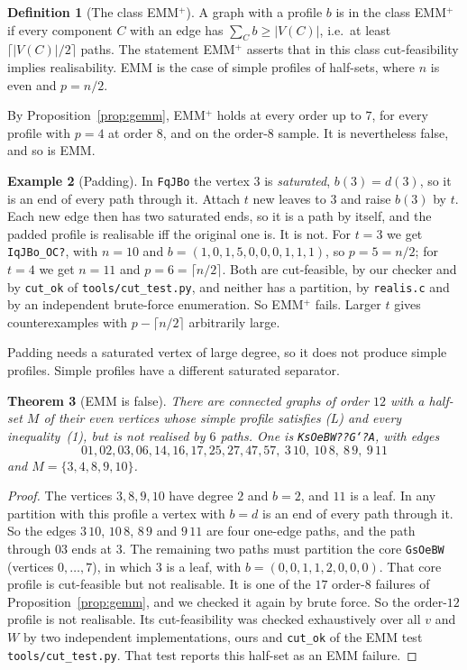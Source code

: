 \documentclass[11pt]{amsart}
\newtheorem{theorem}{Theorem}[section]
\theoremstyle{definition}
\newtheorem{definition}[theorem]{Definition}
\newtheorem{example}[theorem]{Example}
\begin{document}
\begin{definition}[The class EMM$^+$]\label{conj:emmplus}
A graph with a profile $b$ is in the class EMM$^+$ if every component $C$ with an edge has
$\sum_Cb\ge|V(C)|$, i.e.\ at least $\lceil|V(C)|/2\rceil$ paths. The statement EMM$^+$ asserts that
in this class cut-feasibility implies realisability. EMM is the case of simple profiles of
half-sets, where $n$ is even and $p=n/2$.
\end{definition}

By Proposition~\ref{prop:gemm}, EMM$^+$ holds at every order up to $7$, for every profile with $p=4$ at
order $8$, and on the order-$8$ sample. It is nevertheless false, and so is EMM.

\begin{example}[Padding]\label{ex:padding}
In \texttt{FqJBo} the vertex $3$ is \emph{saturated}, $b(3)=d(3)$, so it is an end of every path through
it. Attach $t$ new leaves to $3$ and raise $b(3)$ by $t$. Each new edge then has two saturated ends,
so it is a path by itself, and the padded profile is realisable iff the original one is. It is not.
For $t=3$ we get \texttt{IqJBo\_OC?}, with $n=10$ and $b=(1,0,1,5,0,0,0,1,1,1)$, so $p=5=n/2$; for
$t=4$ we get $n=11$ and $p=6=\lceil n/2\rceil$. Both are cut-feasible, by our checker and by
\texttt{cut\_ok} of \texttt{tools/cut\_test.py}, and neither has a partition, by \texttt{realis.c} and
by an independent brute-force enumeration. So EMM$^+$ fails. Larger $t$ gives counterexamples with
$p-\lceil n/2\rceil$ arbitrarily large.
\end{example}

Padding needs a saturated vertex of large degree, so it does not produce simple profiles. Simple
profiles have a different saturated separator.

\begin{theorem}[EMM is false]\label{thm:emmfalse}
There are connected graphs of order $12$ with a half-set $M$ of their even vertices whose simple
profile satisfies (L) and every inequality~(1), but is not realised by $6$ paths. One is
\texttt{KsOeBW??G`?A}, with edges
\[
01,02,03,06,14,16,17,25,27,47,57,\ 3\,10,\ 10\,8,\ 8\,9,\ 9\,11
\]
and $M=\{3,4,8,9,10\}$.
\end{theorem}
\begin{proof}
The vertices $3,8,9,10$ have degree $2$ and $b=2$, and $11$ is a leaf. In any partition with this
profile a vertex with $b=d$ is an end of every path through it. So the edges $3\,10$, $10\,8$,
$8\,9$ and $9\,11$ are four one-edge paths, and the path through $03$ ends at $3$. The remaining two
paths must partition the core \texttt{GsOeBW} (vertices $0,\dots,7$), in which $3$ is a leaf, with
$b=(0,0,1,1,2,0,0,0)$. That core profile is cut-feasible but not realisable. It is one of the $17$
order-$8$ failures of Proposition~\ref{prop:gemm}, and we checked it again by brute force. So the
order-$12$ profile is not realisable. Its cut-feasibility was checked exhaustively over all $v$
and $W$ by two independent implementations, ours and \texttt{cut\_ok} of the EMM test
\texttt{tools/cut\_test.py}. That test reports this half-set as an EMM failure.
\end{proof}
\end{document}
